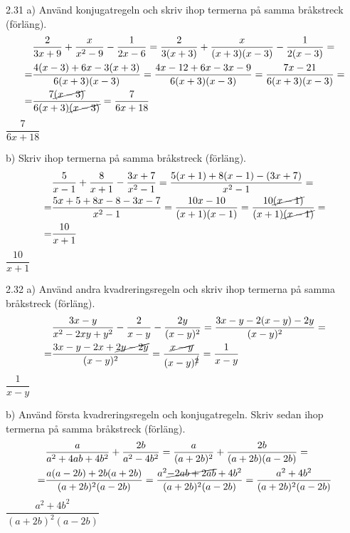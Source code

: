 \begin{task}{2.31 a)}
	Använd konjugatregeln och skriv ihop termerna på samma bråkstreck (förläng).
	\begin{align*}
	&\frac{2}{3x+9}+\frac{x}{x^2-9}-\frac{1}{2x-6}=
	\frac{2}{3(x+3)}+\frac{x}{(x+3)(x-3)}-\frac{1}{2(x-3)}= \\ =
	&\frac{4(x-3)+6x-3(x+3)}{6(x+3)(x-3)}=
	\frac{4x-12+6x-3x-9}{6(x+3)(x-3)}=
	\frac{7x-21}{6(x+3)(x-3)}= \\ =
	&\frac{7\cancel{(x-3)}}{6(x+3)\cancel{(x-3)}}=
	\frac{7}{6x+18}
	\end{align*}
	\ans $\dfrac{7}{6x+18}$
\end{task}

\begin{task}{b)}
	Skriv ihop termerna på samma bråkstreck (förläng).
	\begin{align*}
	&\frac{5}{x-1}+\frac{8}{x+1}-\frac{3x+7}{x^2-1}=
	\frac{5(x+1)+8(x-1)-(3x+7)}{x^2-1}= \\ =
	&\frac{5x+5+8x-8-3x-7}{x^2-1}=
	\frac{10x-10}{(x+1)(x-1)}=
	\frac{10\cancel{(x-1)}}{(x+1)\cancel{(x-1)}}= \\ =
	&\frac{10}{x+1}
	\end{align*}
	\ans $\dfrac{10}{x+1}$
\end{task}

\begin{task}{2.32 a)}
	Använd andra kvadreringsregeln och skriv ihop termerna på samma bråkstreck (förläng).
	\begin{align*}
	&\frac{3x-y}{x^2-2xy+y^2}-\frac{2}{x-y}-\frac{2y}{(x-y)^2}=
	\frac{3x-y-2(x-y)-2y}{(x-y)^2}= \\ =
	&\frac{3x-y-2x+\cancel{2y-2y}}{(x-y)^2}=
	\frac{\cancel{x-y}}{(x-y)^{\cancel{2}}}=
	\frac{1}{x-y}
	\end{align*}
	\ans $\dfrac{1}{x-y}$
\end{task}

\begin{task}{b)}
	Använd första kvadreringsregeln och konjugatregeln. Skriv sedan ihop termerna på samma bråkstreck (förläng).
	\begin{align*}
	&\frac{a}{a^2+4ab+4b^2}+\frac{2b}{a^2-4b^2}=
	\frac{a}{(a+2b)^2}+\frac{2b}{(a+2b)(a-2b)}= \\ =
	&\frac{a(a-2b)+2b(a+2b)}{(a+2b)^2(a-2b)}=
	\frac{a^2\cancel{-2ab+2ab}+4b^2}{(a+2b)^2(a-2b)}=
	\frac{a^2+4b^2}{(a+2b)^2(a-2b)}
	\end{align*}
	\ans $\dfrac{a^2+4b^2}{(a+2b)^2(a-2b)}$
\end{task}

